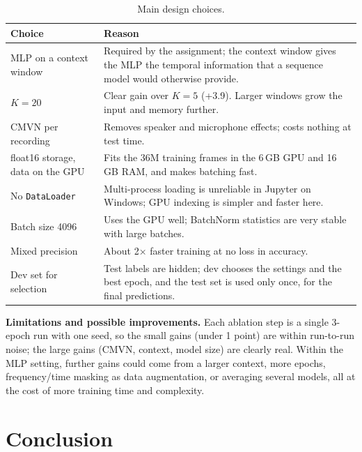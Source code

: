 \documentclass[11pt,a4paper]{article}
\begin{document}
\begin{table}[H]
\centering
\small
\begin{tabular}{p{4.2cm}p{11cm}}
\toprule
Choice & Reason \\
\midrule
MLP on a context window & Required by the assignment; the context window gives the MLP the temporal
                          information that a sequence model would otherwise provide. \\
$K=20$ & Clear gain over $K=5$ (+3.9). Larger windows grow the input and memory further. \\
CMVN per recording & Removes speaker and microphone effects; costs nothing at test time. \\
float16 storage, data on the GPU & Fits the 36M training frames in the 6\,GB GPU and 16\,GB RAM, and
                          makes batching fast. \\
No \texttt{DataLoader} & Multi-process loading is unreliable in Jupyter on Windows; GPU indexing is
                          simpler and faster here. \\
Batch size 4096 & Uses the GPU well; BatchNorm statistics are very stable with large batches. \\
Mixed precision & About 2$\times$ faster training at no loss in accuracy. \\
Dev set for selection & Test labels are hidden; dev chooses the settings and the best epoch, and the test
                          set is used only once, for the final predictions. \\
\bottomrule
\end{tabular}
\caption{Main design choices.}
\end{table}

\textbf{Limitations and possible improvements.} Each ablation step is a single 3-epoch run with one seed,
so the small gains (under 1 point) are within run-to-run noise; the large gains (CMVN, context, model
size) are clearly real. Within the MLP setting, further gains could come from a larger context, more
epochs, frequency/time masking as data augmentation, or averaging several models, all at the cost of more
training time and complexity.

\section{Conclusion}
\end{document}
